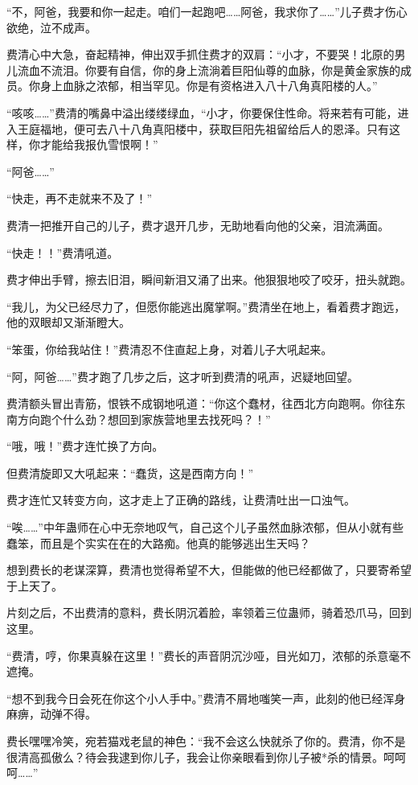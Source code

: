 \begin{this_body}
“不，阿爸，我要和你一起走。咱们一起跑吧……阿爸，我求你了……”儿子费才伤心欲绝，泣不成声。

费清心中大急，奋起精神，伸出双手抓住费才的双肩：“小才，不要哭！北原的男儿流血不流泪。你要有自信，你的身上流淌着巨阳仙尊的血脉，你是黄金家族的成员。你身上血脉之浓郁，相当罕见。你是有资格进入八十八角真阳楼的人。”

“咳咳……”费清的嘴鼻中溢出缕缕绿血，“小才，你要保住性命。将来若有可能，进入王庭福地，便可去八十八角真阳楼中，获取巨阳先祖留给后人的恩泽。只有这样，你才能给我报仇雪恨啊！”

“阿爸……”

“快走，再不走就来不及了！”

费清一把推开自己的儿子，费才退开几步，无助地看向他的父亲，泪流满面。

“快走！！”费清吼道。

费才伸出手臂，擦去旧泪，瞬间新泪又涌了出来。他狠狠地咬了咬牙，扭头就跑。

“我儿，为父已经尽力了，但愿你能逃出魔掌啊。”费清坐在地上，看着费才跑远，他的双眼却又渐渐瞪大。

“笨蛋，你给我站住！”费清忍不住直起上身，对着儿子大吼起来。

“阿，阿爸……”费才跑了几步之后，这才听到费清的吼声，迟疑地回望。

费清额头冒出青筋，恨铁不成钢地吼道：“你这个蠢材，往西北方向跑啊。你往东南方向跑个什么劲？想回到家族营地里去找死吗？！”

“哦，哦！”费才连忙换了方向。

但费清旋即又大吼起来：“蠢货，这是西南方向！”

费才连忙又转变方向，这才走上了正确的路线，让费清吐出一口浊气。

“唉……”中年蛊师在心中无奈地叹气，自己这个儿子虽然血脉浓郁，但从小就有些蠢笨，而且是个实实在在的大路痴。他真的能够逃出生天吗？

想到费长的老谋深算，费清也觉得希望不大，但能做的他已经都做了，只要寄希望于上天了。

片刻之后，不出费清的意料，费长阴沉着脸，率领着三位蛊师，骑着恐爪马，回到这里。

“费清，哼，你果真躲在这里！”费长的声音阴沉沙哑，目光如刀，浓郁的杀意毫不遮掩。

“想不到我今日会死在你这个小人手中。”费清不屑地嗤笑一声，此刻的他已经浑身麻痹，动弹不得。

费长嘿嘿冷笑，宛若猫戏老鼠的神色：“我不会这么快就杀了你的。费清，你不是很清高孤傲么？待会我逮到你儿子，我会让你亲眼看到你儿子被*杀的情景。呵呵呵……”


\end{this_body}
